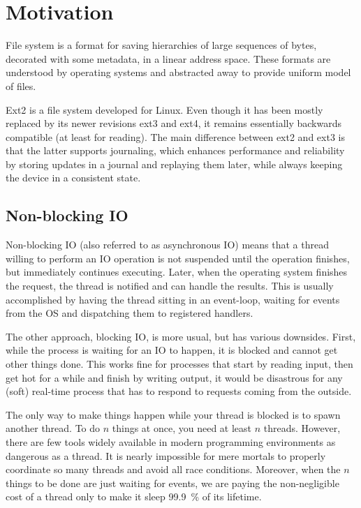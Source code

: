 \chapter{Motivation}

File system is a format for saving hierarchies of large sequences of bytes,
decorated with some metadata, in a linear address space. These formats are
understood by operating systems and abstracted away to provide uniform model of
files.

Ext2 is a file system developed for Linux. Even though it has been mostly
replaced by its newer revisions ext3 and ext4, it remains essentially backwards
compatible (at least for reading). The main difference between ext2 and ext3 is
that the latter supports journaling, which enhances performance and reliability
by storing updates in a journal and replaying them later, while always keeping
the device in a consistent state.

\section{Non-blocking IO}

Non-blocking IO (also referred to as asynchronous IO) means that a thread
willing to perform an IO operation is not suspended until the operation
finishes, but immediately continues executing. Later, when the operating system
finishes the request, the thread is notified and can handle the results. This is
usually accomplished by having the thread sitting in an event-loop, waiting for
events from the OS and dispatching them to registered handlers.

The other approach, blocking IO, is more usual, but has various downsides.
First, while the process is waiting for an IO to happen, it is blocked and
cannot get other things done. This works fine for processes that start by
reading input, then get hot for a while and finish by writing output, it would
be disastrous for any (soft) real-time process that has to respond to requests
coming from the outside.

The only way to make things happen while your thread is blocked is to spawn
another thread. To do $n$ things at once, you need at least $n$ threads.
However, there are few tools widely available in modern programming environments
as dangerous as a thread. It is nearly impossible for mere mortals to properly
coordinate so many threads and avoid all race conditions. Moreover, when the $n$
things to be done are just waiting for events, we are paying the non-negligible
cost of a thread only to make it sleep 99.9~\% of its lifetime.

